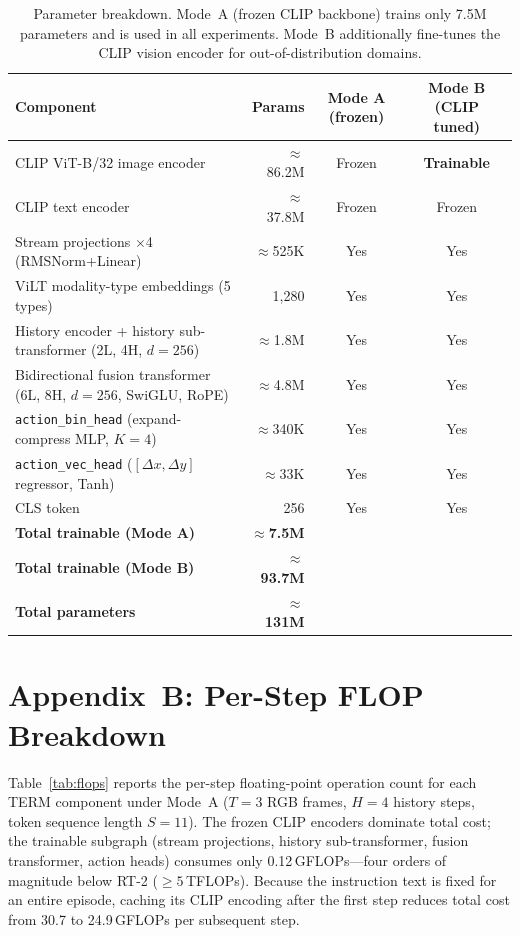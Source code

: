 \documentclass[letterpaper]{article} %
\begin{document}
\begin{table}[h]
\centering
\setlength{\tabcolsep}{4pt}
\small
\begin{tabular}{lrcc}
\toprule
\textbf{Component} & \textbf{Params} & \textbf{Mode A (frozen)} & \textbf{Mode B (CLIP tuned)} \\
\midrule
CLIP ViT-B/32 image encoder & ${\approx}$86.2M & Frozen & \textbf{Trainable} \\
CLIP text encoder & ${\approx}$37.8M & Frozen & Frozen \\
\midrule
Stream projections $\times$4 (RMSNorm+Linear) & ${\approx}$525K & Yes & Yes \\
ViLT modality-type embeddings (5 types) & 1,280 & Yes & Yes \\
History encoder + history sub-transformer (2L, 4H, $d{=}256$) & ${\approx}$1.8M & Yes & Yes \\
Bidirectional fusion transformer (6L, 8H, $d{=}256$, SwiGLU, RoPE) & ${\approx}$4.8M & Yes & Yes \\
\texttt{action\_bin\_head} (expand-compress MLP, $K{=}4$) & ${\approx}$340K & Yes & Yes \\
\texttt{action\_vec\_head} ($[\Delta x,\Delta y]$ regressor, Tanh) & ${\approx}$33K & Yes & Yes \\
CLS token & 256 & Yes & Yes \\
\midrule
\textbf{Total trainable (Mode A)} & ${\approx}$\textbf{7.5M} & & \\
\textbf{Total trainable (Mode B)} & ${\approx}$\textbf{93.7M} & & \\
\textbf{Total parameters} & ${\approx}$\textbf{131M} & & \\
\bottomrule
\end{tabular}
\caption{Parameter breakdown. Mode~A (frozen CLIP backbone) trains only 7.5M parameters and is used in all experiments. Mode~B additionally fine-tunes the CLIP vision encoder for out-of-distribution domains.}
\label{tab:params}
\end{table}

\section*{Appendix~B: Per-Step FLOP Breakdown}

Table~\ref{tab:flops} reports the per-step floating-point operation count for each TERM component under Mode~A ($T{=}3$ RGB frames, $H{=}4$ history steps, token sequence length $S{=}11$). The frozen CLIP encoders dominate total cost; the trainable subgraph (stream projections, history sub-transformer, fusion transformer, action heads) consumes only 0.12\,GFLOPs---four orders of magnitude below RT-2 (${\ge}5$\,TFLOPs). Because the instruction text is fixed for an entire episode, caching its CLIP encoding after the first step reduces total cost from 30.7 to 24.9\,GFLOPs per subsequent step.
\end{document}
